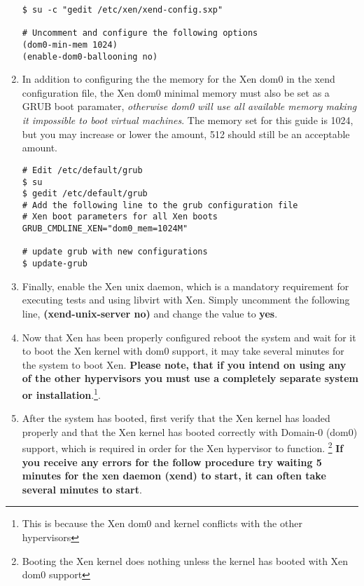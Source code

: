 \begin{enumerate}
\lstset{language=bash,caption=Configure Xen Memory Use}
\begin{lstlisting}
$ su -c "gedit /etc/xen/xend-config.sxp"

# Uncomment and configure the following options
(dom0-min-mem 1024)
(enable-dom0-ballooning no)
\end{lstlisting}
			
\item	In addition to configuring the 	the memory for the Xen dom0 in the xend configuration file, the Xen dom0 minimal
			memory must also be set as a GRUB boot paramater, \emph{otherwise dom0 will use all available memory making it
			impossible to boot virtual machines}. The memory set for this guide is 1024, but you may increase or lower the 
			amount, 512 should still be an acceptable amount.

\lstset{language=bash,caption=Configure Xen Memory Use as GRUB Boot Paramater}
\begin{lstlisting}
# Edit /etc/default/grub
$ su
$ gedit /etc/default/grub
# Add the following line to the grub configuration file
# Xen boot parameters for all Xen boots
GRUB_CMDLINE_XEN="dom0_mem=1024M"
 		
# update grub with new configurations
$ update-grub
\end{lstlisting}

\item	Finally, enable the Xen unix daemon, which is a mandatory requirement for executing tests and using libvirt with Xen. Simply 	
			uncomment the following line, {\bf (xend-unix-server no)} and change the value to {\bf yes}. 

\item	Now that Xen has been properly configured reboot the system and wait for it to boot the Xen kernel with dom0
			support, it may take several minutes for the system to boot Xen. {\bf Please note, that if you intend
			on using any of the other hypervisors you must use a completely separate system or installation}.\footnote{This
			is because the Xen dom0 and kernel conflicts with the other hypervisors}.

\item	After the system has booted, first verify that the Xen kernel has loaded properly and that the Xen kernel has booted
			correctly with Domain-0 (dom0) support, which is required in order for the Xen hypervisor to function. \footnote{Booting
			the Xen kernel does nothing unless the kernel has booted with Xen dom0 support} {\bf If you receive any errors for the 
			follow procedure try waiting 5 minutes for the xen daemon (xend) to start, it can often take several minutes to start}.


\end{enumerate}
